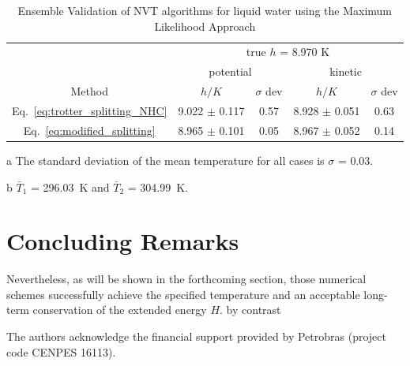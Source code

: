 \documentclass[journal=jctcce,manuscript=article,layout=twocolumn]{achemso}
\newcommand{\timestep}{h}
\begin{document}
\begin{table}
	\begin{threeparttable}
		\caption{Ensemble Validation of NVT algorithms for liquid water using the Maximum Likelihood Approach  }
		\label{table:ensemblevalidation}
			\begin{tabular}{ccccc}
				& \multicolumn{4}{c}{true $\timestep$ = 8.970 K} \\
				\cline{2-5}
				& \multicolumn{2}{c}{potential} & \multicolumn{2}{c}{kinetic}\\
				\hline
				Method  &$\timestep/K$ & $\sigma$ dev & $\timestep/K$ & $\sigma$ dev \\
				\hline %
				Eq.~\eqref{eq:trotter_splitting_NHC} & 9.022 $\pm$ 0.117 & 0.57 & 8.928 $\pm$ 0.051 & 0.63 \\
				Eq.~\eqref{eq:modified_splitting}    & 8.965 $\pm$ 0.101 & 0.05 & 8.967 $\pm$ 0.052 & 0.14
		\end{tabular}
		\begin{tablenotes}
			\item[a] The standard deviation of the mean temperature for all cases is $\sigma$ = 0.03.
			\item[b] $\bar{T}_1$ = 296.03~K and $\bar{T}_2$ = 304.99~K.
		\end{tablenotes}
	\end{threeparttable}
\end{table}



\section{Concluding Remarks}
\label{sec:conclusion}
Nevertheless, as will be shown in the forthcoming section, those numerical schemes successfully achieve the specified temperature and an acceptable long-term conservation of the extended energy $H$. 
by contrast

\begin{acknowledgement}
	The authors acknowledge the financial support provided by Petrobras (project code CENPES 16113).
\end{acknowledgement}
\end{document}
